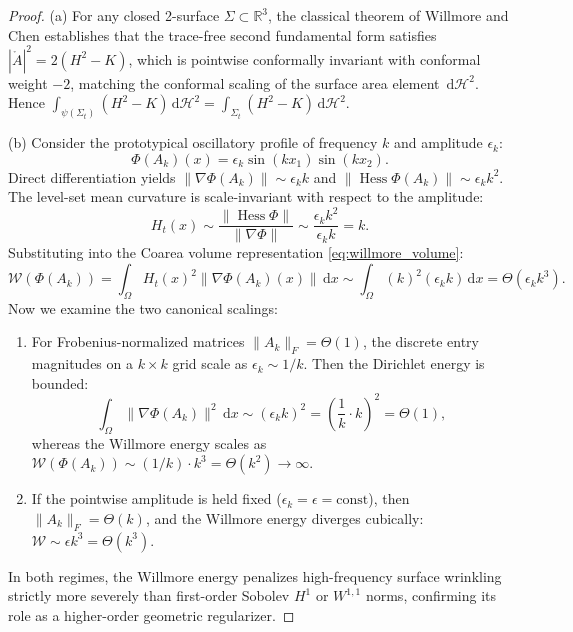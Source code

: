 \documentclass[11pt,a4paper,reqno]{amsart}
\theoremstyle{definition}
\numberwithin{equation}{section}
\newcommand{\R}{\mathbb{R}}
\newcommand{\dif}{\,\mathrm{d}}
\newcommand{\Hess}{\operatorname{Hess}}
\begin{document}
\begin{proof}
(a) For any closed 2-surface $\Sigma \subset \R^3$, the classical theorem of Willmore and Chen \cite{willmore1993riemannian} establishes that the trace-free second fundamental form satisfies $|\mathring{A}|^2 = 2(H^2 - K)$, which is pointwise conformally invariant with conformal weight $-2$, matching the conformal scaling of the surface area element $\dif \mathcal{H}^2$. Hence $\int_{\psi(\Sigma_t)} (H^2 - K) \dif \mathcal{H}^2 = \int_{\Sigma_t} (H^2 - K) \dif \mathcal{H}^2$.

(b) Consider the prototypical oscillatory profile of frequency $k$ and amplitude $\epsilon_k$:
\begin{equation}
    \Phi(A_k)(x) = \epsilon_k \sin(k x_1) \sin(k x_2).
\end{equation}
Direct differentiation yields $\|\nabla \Phi(A_k)\| \sim \epsilon_k k$ and $\|\Hess \Phi(A_k)\| \sim \epsilon_k k^2$. 
The level-set mean curvature is scale-invariant with respect to the amplitude:
\begin{equation}
    H_t(x) \sim \frac{\|\Hess \Phi\|}{\|\nabla \Phi\|} \sim \frac{\epsilon_k k^2}{\epsilon_k k} = k.
\end{equation}
Substituting into the Coarea volume representation \eqref{eq:willmore_volume}:
\begin{equation}
    \mathcal{W}(\Phi(A_k)) = \int_\Omega H_t(x)^2 \|\nabla \Phi(A_k)(x)\| \dif x \sim \int_\Omega (k)^2 (\epsilon_k k) \dif x = \Theta(\epsilon_k k^3).
\end{equation}
Now we examine the two canonical scalings:
\begin{enumerate}[label=(\roman*)]
    \item For Frobenius-normalized matrices $\|A_k\|_F = \Theta(1)$, the discrete entry magnitudes on a $k \times k$ grid scale as $\epsilon_k \sim 1/k$. Then the Dirichlet energy is bounded:
    \begin{equation}
        \int_\Omega \|\nabla \Phi(A_k)\|^2 \dif x \sim (\epsilon_k k)^2 = \left(\frac{1}{k} \cdot k\right)^2 = \Theta(1),
    \end{equation}
    whereas the Willmore energy scales as $\mathcal{W}(\Phi(A_k)) \sim (1/k) \cdot k^3 = \Theta(k^2) \to \infty$.
    \item If the pointwise amplitude is held fixed ($\epsilon_k = \epsilon = \mathrm{const}$), then $\|A_k\|_F = \Theta(k)$, and the Willmore energy diverges cubically: $\mathcal{W} \sim \epsilon k^3 = \Theta(k^3)$.
\end{enumerate}
In both regimes, the Willmore energy penalizes high-frequency surface wrinkling strictly more severely than first-order Sobolev $H^1$ or $W^{1,1}$ norms, confirming its role as a higher-order geometric regularizer.
\end{proof}
\end{document}
